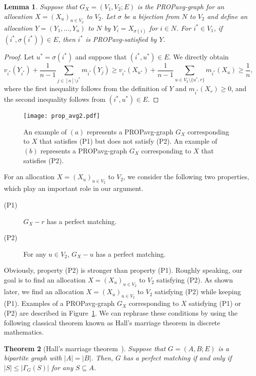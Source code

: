 \documentclass[11pt]{article}
\newtheorem{theorem}{Theorem}
\newtheorem{lemma}[theorem]{Lemma}
\newcommand{\PROPavg}{\textsf{PROPavg}\xspace}
\begin{document}
\begin{lemma}\label{ob: v1}
Suppose that $G_X=(V_1, V_2; E)$ is the \PROPavg-graph for  an allocation $X=(X_u)_{u\in V_2}$ to $V_2$. 
Let $\sigma$ be a bijection from $N$ to $V_2$  and 
define an allocation $Y=(Y_1,\ldots, Y_n)$ to $N$ by $Y_i = X_{\sigma(i)}$ for $i \in N$. 
For $i^*\in V_1$, if $(i^*, \sigma(i^*)) \in E$, then 
$i^*$ is \PROPavg-satisfied by $Y$.
\end{lemma}
\begin{proof}
Let $u^* = \sigma(i^*)$ and suppose that $(i^*, u^*) \in E$. 
We directly obtain
\begin{equation*}
v_{i^*}(Y_{i^*})+\frac{1}{n-1}\sum_{j\in [n]\setminus {i^*}} m_{i^*}(Y_j)\ge v_{i^*}(X_{u^*})+\frac{1}{n-1}\sum_{u\in V_2 \setminus \{u^*, r\}} m_{i^*}(X_u) \ge \frac{1}{n},
\end{equation*}
where the first inequality follows from the definition of $Y$ and $m_{i^*}(X_r) \ge 0$, and the second inequality follows from $(i^*, u^*)\in E$.
\end{proof}
\begin{figure}[tbp]
  \begin{center}
   \texttt{[image: prop\_avg2.pdf]}
 \end{center}
  \caption{An example of $(a)$ represents a \PROPavg-graph $G_X$ corresponding to $X$ that satisfies (P1) but does not satisfy (P2). An example of $(b)$ represents a \PROPavg-graph $G_X$ corresponding to $X$ that satisfies (P2).}
  \label{fig: 2}
\end{figure}

For an allocation $X=(X_u)_{u\in V_2}$ to $V_2$, 
we consider the following two properties, which play an important role in our argument.
\begin{description}
\item[(P1)] $G_X- r$ has a perfect matching.
\item[(P2)] For any $u \in V_2$, $G_X-u$ has a perfect matching.
\end{description}
Obviously, property (P2) is stronger than property (P1). 
Roughly speaking, our goal is to find an allocation $X=(X_u)_{u\in V_2}$ to $V_2$ satisfying (P2).
As shown later, we find an allocation $X=(X_u)_{u\in V_2}$ to $V_2$ satisfying (P2) while keeping (P1).
Examples of a \PROPavg-graph $G_X$ corresponding to $X$ satisfying (P1) or (P2) are described in Figure~\ref{fig: 2}.
We can rephrase these conditions by using the following classical theorem known as Hall's marriage theorem in discrete mathematics.
\begin{theorem}[Hall's marriage theorem~\cite{hall1935representatives}]
Suppose that $G=(A, B; E)$ is a bipartite graph with $|A|=|B|$. 
Then, $G$ has a perfect matching if and only if $|S| \le |\Gamma_G(S)|$ for any $S\subseteq A$.
\end{theorem}
\end{document}
